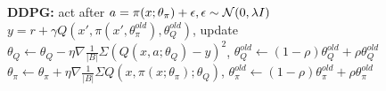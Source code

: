 \textbf{DDPG:} act after $a = \pi(x; \theta_\pi) + \epsilon, \epsilon \sim \mathcal{N}(0, \lambda I)$\\
$y = r + \gamma Q(x', \pi(x', \theta_\pi^{old}), \theta_Q^{old})$, update\\
$\theta_Q \leftarrow \theta_Q - \eta \nabla \frac{1}{|B|}\Sigma(Q(x,a;\theta_Q) - y)^2$, $\theta_Q^{old} \leftarrow (1-\rho) \theta_Q^{old} + \rho \theta_Q^{old}$\\
$\theta_\pi \leftarrow \theta_\pi + \eta\nabla\frac{1}{|B|}\Sigma Q(x, \pi(x;\theta_\pi); \theta_Q)$, $\theta_\pi^{old} \leftarrow (1-\rho) \theta_\pi^{old} + \rho \theta_\pi^{old}$\\
\begin{comment}
	We here have random Gaussian noise injected to explore.\\
\end{comment}





